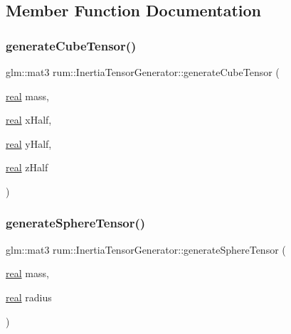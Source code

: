 \subsection{Member Function Documentation}
\mbox{\label{classrum_1_1_inertia_tensor_generator_a95d0bac5bb1f99a9521430d3bcb7ed04}} 
\subsubsection{\texorpdfstring{generate\+Cube\+Tensor()}{generateCubeTensor()}}
{\footnotesize\ttfamily glm\+::mat3 rum\+::\+Inertia\+Tensor\+Generator\+::generate\+Cube\+Tensor (\begin{DoxyParamCaption}\item[{\mbox{\hyperlink{namespacerum_a7e8cca23573d5eaead0f138cbaa4862c}{real}}}]{mass,  }\item[{\mbox{\hyperlink{namespacerum_a7e8cca23573d5eaead0f138cbaa4862c}{real}}}]{x\+Half,  }\item[{\mbox{\hyperlink{namespacerum_a7e8cca23573d5eaead0f138cbaa4862c}{real}}}]{y\+Half,  }\item[{\mbox{\hyperlink{namespacerum_a7e8cca23573d5eaead0f138cbaa4862c}{real}}}]{z\+Half }\end{DoxyParamCaption})\hspace{0.3cm}{\ttfamily [static]}}

\mbox{\label{classrum_1_1_inertia_tensor_generator_a09e5c5415aed546cc95e2b4527ec19d7}} 
\subsubsection{\texorpdfstring{generate\+Sphere\+Tensor()}{generateSphereTensor()}}
{\footnotesize\ttfamily glm\+::mat3 rum\+::\+Inertia\+Tensor\+Generator\+::generate\+Sphere\+Tensor (\begin{DoxyParamCaption}\item[{\mbox{\hyperlink{namespacerum_a7e8cca23573d5eaead0f138cbaa4862c}{real}}}]{mass,  }\item[{\mbox{\hyperlink{namespacerum_a7e8cca23573d5eaead0f138cbaa4862c}{real}}}]{radius }\end{DoxyParamCaption})\hspace{0.3cm}{\ttfamily [static]}}



